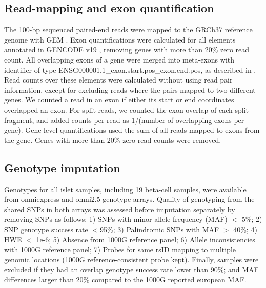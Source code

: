 \subsection{Read-mapping and exon quantification}
The 100-bp sequenced paired-end reads were mapped to the GRCh37 reference genome with GEM \cite{marco-solaGEMMapperFast2012}. Exon quantifications were calculated for all elements annotated in GENCODE v19 \cite{harrowGENCODEReferenceHuman2012}, removing genes with more than 20\% zero read count. All overlapping exons of a gene were merged into meta-exons with identifier of type ENSG000001.1\_exon.start.pos\_exon.end.pos, as described in \cite{lappalainenTranscriptomeGenomeSequencing2013}. Read counts over these elements were calculated without using read pair information, except for excluding reads where the pairs mapped to two different genes. We counted a read in an exon if either its start or end coordinates overlapped an exon. For split reads, we counted the exon overlap of each split fragment, and added counts per read as 1/(number of overlapping exons per gene). Gene level quantifications used the sum of all reads mapped to exons from the gene. Genes with more than 20\% zero read counts were removed.  	

\subsection{Genotype imputation}
Genotypes for all islet samples, including 19 beta-cell samples, were available from omniexpress and omni2.5 genotype arrays. Quality of genotyping from the shared SNPs in both arrays was assessed before imputation separately by removing SNPs as follows: 1) SNPs with minor allele frequency (MAF) $<$ 5\%; 2) SNP genotype success rate $<$95\%; 3) Palindromic SNPs with MAF $>$ 40\%; 4) HWE $<$ 1e-6; 5) Absence from 1000G reference panel; 6) Allele inconsistencies with 1000G reference panel; 7) Probes for same rsID mapping to multiple genomic locations (1000G reference-consistent probe kept). Finally, samples were excluded if they had an overlap genotype success rate lower than 90\%; and MAF differences larger than 20\% compared to the 1000G reported european MAF. \\
    
